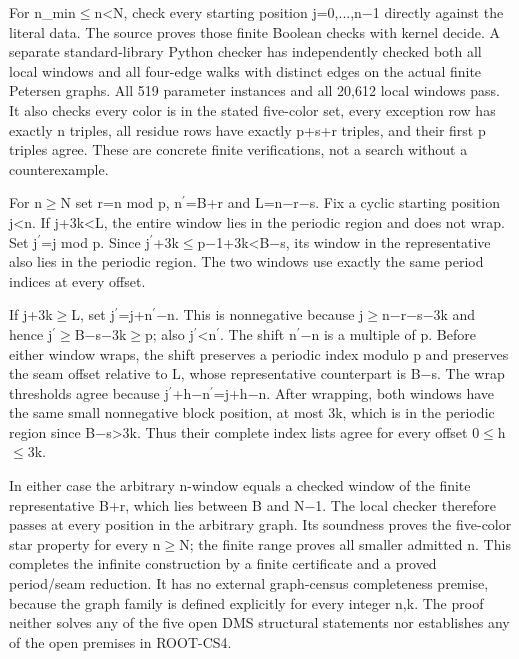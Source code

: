 \documentclass[11pt,a4paper]{article}
\begin{document}
For n\_min\ensuremath{\leq}n<N, check every starting position j=0,...,n\ensuremath{-}1 directly against the literal data. The source proves those finite Boolean checks with kernel decide. A separate standard-library Python checker has independently checked both all local windows and all four-edge walks with distinct edges on the actual finite Petersen graphs. All 519 parameter instances and all 20,612 local windows pass. It also checks every color is in the stated five-color set, every exception row has exactly n triples, all residue rows have exactly p+s+r triples, and their first p triples agree. These are concrete finite verifications, not a search without a counterexample.

For n\ensuremath{\geq}N set r=n mod p, n\ensuremath{^{\prime}}=B+r and L=n\ensuremath{-}r\ensuremath{-}s. Fix a cyclic starting position j<n. If j+3k<L, the entire window lies in the periodic region and does not wrap. Set j\ensuremath{^{\prime}}=j mod p. Since j\ensuremath{^{\prime}}+3k\ensuremath{\leq}p\ensuremath{-}1+3k<B\ensuremath{-}s, its window in the representative also lies in the periodic region. The two windows use exactly the same period indices at every offset.

If j+3k\ensuremath{\geq}L, set j\ensuremath{^{\prime}}=j+n\ensuremath{^{\prime}}\ensuremath{-}n. This is nonnegative because j\ensuremath{\geq}n\ensuremath{-}r\ensuremath{-}s\ensuremath{-}3k and hence j\ensuremath{^{\prime}}\ensuremath{\geq}B\ensuremath{-}s\ensuremath{-}3k\ensuremath{\geq}p; also j\ensuremath{^{\prime}}<n\ensuremath{^{\prime}}. The shift n\ensuremath{^{\prime}}\ensuremath{-}n is a multiple of p. Before either window wraps, the shift preserves a periodic index modulo p and preserves the seam offset relative to L, whose representative counterpart is B\ensuremath{-}s. The wrap thresholds agree because j\ensuremath{^{\prime}}+h\ensuremath{-}n\ensuremath{^{\prime}}=j+h\ensuremath{-}n. After wrapping, both windows have the same small nonnegative block position, at most 3k, which is in the periodic region since B\ensuremath{-}s>3k. Thus their complete index lists agree for every offset 0\ensuremath{\leq}h\ensuremath{\leq}3k.

In either case the arbitrary n-window equals a checked window of the finite representative B+r, which lies between B and N\ensuremath{-}1. The local checker therefore passes at every position in the arbitrary graph. Its soundness proves the five-color star property for every n\ensuremath{\geq}N; the finite range proves all smaller admitted n. This completes the infinite construction by a finite certificate and a proved period/seam reduction. It has no external graph-census completeness premise, because the graph family is defined explicitly for every integer n,k. The proof neither solves any of the five open DMS structural statements nor establishes any of the open premises in ROOT-CS4.
\end{document}
